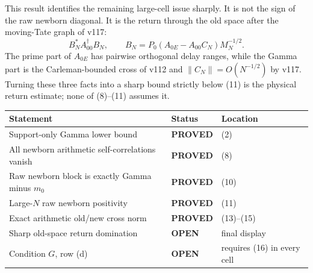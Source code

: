 \documentclass[11pt]{article}
\newcommand{\PROVED}{\textcolor{green!40!black}{\textbf{PROVED}}}
\newcommand{\OPEN}{\textcolor{red!70!black}{\textbf{OPEN}}}
\begin{document}
This result identifies the remaining large-cell issue sharply.  It is not
the sign of the raw newborn diagonal.  It is the return through the old
space after the moving-Tate graph of v117:
\begin{equation}
 B_N^*A_{00}^\dagger B_N,
 \qquad
 B_N=P_0(A_{0E}-A_{00}C_N)M_N^{-1/2}.                        \tag{16}
\end{equation}
The prime part of $A_{0E}$ has pairwise orthogonal delay ranges, while the
Gamma part is the Carleman-bounded cross of v112 and
$\|C_N\|=O(N^{-1/2})$ by v117.  Turning these three facts into a sharp
bound strictly below (11) is the physical return estimate; none of
(8)--(11) assumes it.

\begin{center}
\begin{tabular}{>{\raggedright\arraybackslash}p{.55\linewidth}
                >{\centering\arraybackslash}p{.15\linewidth}
                >{\raggedright\arraybackslash}p{.20\linewidth}}
\toprule
Statement & Status & Location \\
\midrule
Support-only Gamma lower bound & \PROVED & (2) \\
All newborn arithmetic self-correlations vanish & \PROVED & (8) \\
Raw newborn block is exactly Gamma minus $m_0$ & \PROVED & (10) \\
Large-$N$ raw newborn positivity & \PROVED & (11) \\
Exact arithmetic old/new cross norm & \PROVED & (13)--(15) \\
Sharp old-space return domination & \OPEN & final display \\
Condition $G$, row (d) & \OPEN & requires (16) in every cell \\
\bottomrule
\end{tabular}
\end{center}
\end{document}
